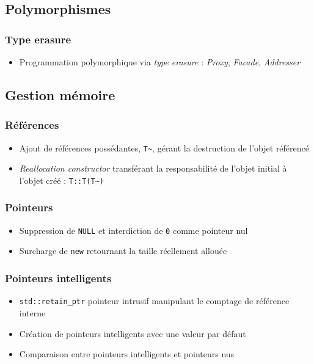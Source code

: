 \documentclass[C++.tex]{subfiles}
\begin{document}
\subsection*{Polymorphismes}
\begin{frame}[fragile]
	\frametitle{Type erasure}
	\begin{itemize}
		\item Programmation polymorphique via \textit{type erasure} : \textit{Proxy}, \textit{Facade}, \textit{Addresser}

	\end{itemize}
\end{frame}

\subsection*{Gestion mémoire}
\begin{frame}[fragile]
	\frametitle{Références}
	\begin{itemize}
		\item Ajout de références possédantes, \lstinline|T~|, gérant la destruction de l'objet référencé
		\item \textit{Reallocation constructor} transférant la responsabilité de l'objet initial à l'objet créé : \lstinline|T::T(T~)|
	\end{itemize}
\end{frame}

\begin{frame}[fragile]
	\frametitle{Pointeurs}
	\begin{itemize}
		\item Suppression de \lstinline|NULL| et interdiction de \lstinline|0| comme pointeur nul
		\item Surcharge de \lstinline|new| retournant la taille réellement allouée
	\end{itemize}
\end{frame}

\begin{frame}[fragile]
	\frametitle{Pointeurs intelligents}
	\begin{itemize}
		\item \lstinline|std::retain_ptr| pointeur intrusif manipulant le comptage de référence interne
		\item Création de pointeurs intelligents avec une valeur par défaut
		\item Comparaison entre pointeurs intelligents et pointeurs nus
	\end{itemize}
\end{frame}
\end{document}
